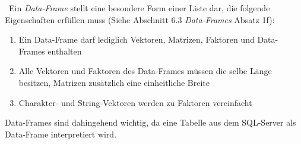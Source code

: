 ~\newline Ein \textit{Data-Frame} stellt eine besondere Form einer Liste dar, die folgende Eigenschaften erfüllen muss (Siehe \cite{RIntro} Abschnitt 6.3 \textit{Data-Frames} Absatz 1f): 
\begin{enumerate}
	\item Ein Data-Frame darf lediglich Vektoren, Matrizen, Faktoren und Data-Frames enthalten
	\item Alle Vektoren und Faktoren des Data-Frames müssen die selbe Länge besitzen, Matrizen zusätzlich eine einheitliche Breite
	\item Charakter- und String-Vektoren werden zu Faktoren vereinfacht
\end{enumerate} 
Data-Frames sind dahingehend wichtig, da eine Tabelle aus dem SQL-Server als Data-Frame interpretiert wird. 
